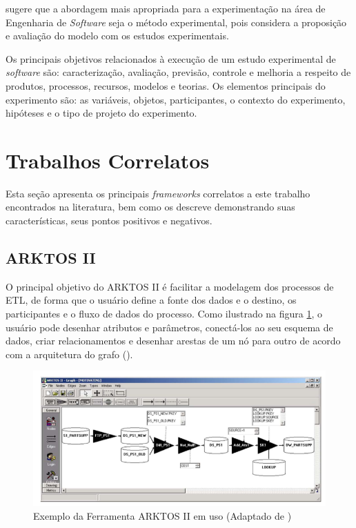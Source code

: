 \cite{travassos:2002} sugere que a abordagem mais apropriada para a experimentação na área de Engenharia de \textit{Software} seja o método experimental, pois considera a proposição e avaliação do modelo com os estudos experimentais.

Os principais objetivos relacionados à execução de um estudo experimental de \textit{software} são: caracterização, avaliação, previsão, controle e melhoria a respeito de produtos, processos, recursos, modelos e teorias. Os elementos principais do experimento são: as variáveis, objetos, participantes, o contexto do experimento, hipóteses e o tipo de projeto do experimento.

\section{Trabalhos Correlatos}

\noindent Esta seção apresenta os principais \textit{frameworks} correlatos a este trabalho encontrados na literatura, bem como os descreve demonstrando suas características, seus pontos positivos e negativos.



\subsection{ARKTOS II}

O principal objetivo do ARKTOS II é facilitar a modelagem dos processos de ETL, de forma que o usuário define a fonte dos dados e o destino, os participantes e o fluxo de dados do processo. Como ilustrado na figura \ref{arktosii}, o usuário pode desenhar atributos e parâmetros, conectá-los ao seu esquema de dados, criar relacionamentos e desenhar arestas de um nó para outro de acordo com a arquitetura do grafo (\cite{vassiliadis:2005}).


\begin{figure}[h]
	\centering
	\includegraphics[scale=0.5]{fig/arktosii.png}
	\caption{Exemplo da Ferramenta ARKTOS II em uso (Adaptado de \cite{vassiliadis:2005})}
	\label{arktosii}
\end{figure}

